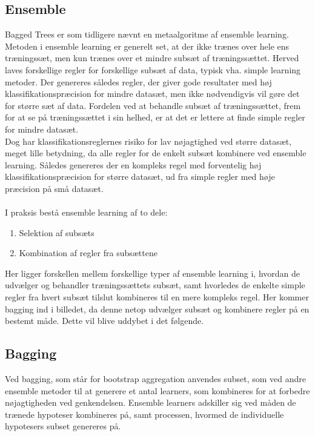 \subsection{Ensemble}
Bagged Trees er som tidligere nævnt en metaalgoritme af ensemble learning. Metoden i ensemble learning er generelt set, at der ikke trænes over hele ens træningssæt, men kun trænes over et mindre subsæt af træningssættet. Herved laves forskellige regler for forskellige subsæt af data, typisk vha. simple learning metoder. Der genereres således regler, der giver gode resultater med høj klassifikationspræcision for mindre datasæt, men ikke nødvendigvis vil gøre det for større sæt af data. 
Fordelen ved at behandle subsæt af træningssættet, frem for at se på træningssættet i sin helhed, er at det er lettere at finde simple regler for mindre datasæt.
\\Dog har klassifikationsreglernes risiko for lav nøjagtighed ved større datasæt, meget lille betydning, da alle regler for de enkelt subsæt kombinere ved ensemble learning. Således genereres der en kompleks regel med forventelig høj klassifikationspræcision for større datasæt, ud fra simple regler med høje præcision på små datasæt.
\\\\
I praksis bestå ensemble learning af to dele:
\begin{enumerate}
\item Selektion af subsæts
\item Kombination af regler fra subsættene
\end{enumerate}

Her ligger forskellen mellem forskellige typer af ensemble learning i, hvordan de udvælger og behandler træningssættets subsæt, samt hvorledes de enkelte simple regler fra hvert subsæt tilslut kombineres til en mere kompleks regel. 
Her kommer bagging ind i billedet, da denne netop udvælger subsæt og kombinere regler på en bestemt måde. Dette vil blive uddybet i det følgende. 

\subsection{Bagging}
Ved bagging, som står for bootstrap aggregation anvendes subset, som ved andre ensemble metoder til at generere et antal learners, som kombineres for at forbedre nøjagtigheden ved genkendelsen. Ensemble learners adskiller sig ved måden de trænede hypoteser kombineres på, samt processen, hvormed de individuelle hypotesers subset genereres på. 

